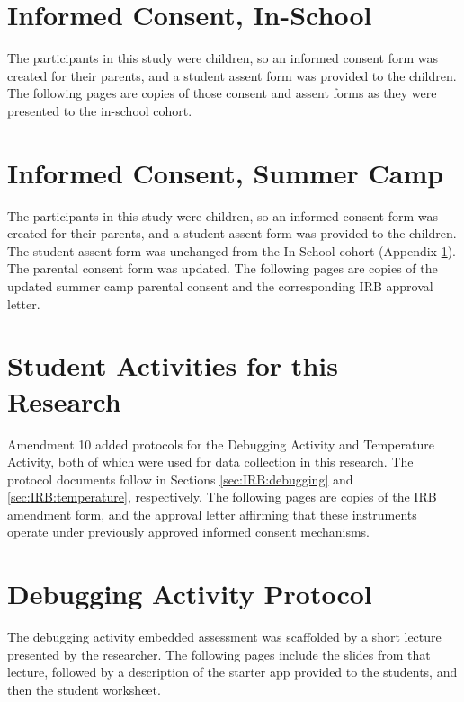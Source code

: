 


\section{Informed Consent, In-School}
\label{sec:icf:school}
The participants in this study were children, so an informed consent form was created for their parents, and a student assent form was provided to the children. The following pages are copies of those consent and assent forms as they were presented to the in-school cohort.




\section{Informed Consent, Summer Camp}
\label{sec:icf:camp}
The participants in this study were children, so an informed consent form was created for their parents, and a student assent form was provided to the children. The student assent form was unchanged from the In-School cohort (Appendix \ref{sec:icf:school}). The parental consent form was updated. The following pages are copies of the updated summer camp parental consent and the corresponding IRB approval letter.





\section{Student Activities for this Research}
Amendment 10 added protocols for the Debugging Activity and Temperature Activity, both of which were used for data collection in this research. The protocol documents follow in Sections \ref{sec:IRB:debugging} and \ref{sec:IRB:temperature}, respectively. The following pages are copies of the IRB amendment form, and the approval letter affirming that these instruments operate under previously approved informed consent mechanisms. 





\section{Debugging Activity Protocol}
The debugging activity embedded assessment was scaffolded by a short lecture presented by the researcher. The following pages include the slides from that lecture, followed by a description of the starter app provided to the students, and then the student worksheet.


\label{sec:IRB:debugging}


